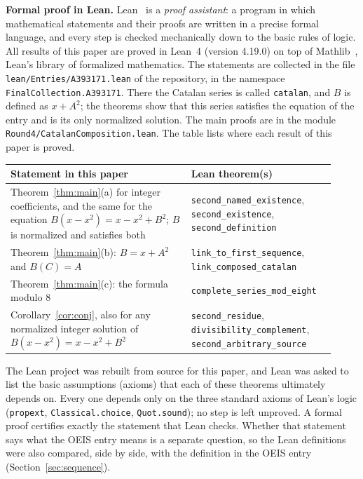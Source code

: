 \documentclass[11pt,a4paper]{article}
\theoremstyle{definition}
\theoremstyle{remark}
\newcommand{\para}[1]{\par\medskip\noindent\textbf{#1}\enspace}
\begin{document}
\para{Formal proof in Lean.}
Lean~\cite{lean} is a \emph{proof assistant}: a program in which mathematical statements and their proofs are written
in a precise formal language, and every step is checked mechanically down to the basic rules of logic. All results of
this paper are proved in Lean~4 (version 4.19.0) on top of Mathlib~\cite{mathlib}, Lean's library of formalized
mathematics. The statements are collected in the file \texttt{lean/Entries/A393171.lean} of the repository,
in the namespace \texttt{FinalCollection.A393171}. There the Catalan series is called \texttt{catalan}, and $B$ is defined as $x+A^2$; the theorems show that this series satisfies the equation of the entry and is its only normalized solution. The main proofs are in the module \texttt{Round4/CatalanComposition.lean}.
The table lists where each result of this paper is proved.
\begin{center}\small\renewcommand{\arraystretch}{1.25}
\begin{tabular}{>{\raggedright\arraybackslash}p{0.52\linewidth}>{\raggedright\arraybackslash}p{0.4\linewidth}}
\toprule
Statement in this paper & Lean theorem(s)\\
\midrule
Theorem~\ref{thm:main}(a) for integer coefficients, and the same for the equation $B(x-x^2)=x-x^2+B^2$; $B$ is normalized and satisfies both & \texttt{second\_\allowbreak{}named\_\allowbreak{}existence}, \texttt{second\_\allowbreak{}existence}, \texttt{second\_\allowbreak{}definition} \\
Theorem~\ref{thm:main}(b): $B=x+A^2$ and $B(C)=A$ & \texttt{link\_\allowbreak{}to\_\allowbreak{}first\_\allowbreak{}sequence}, \texttt{link\_\allowbreak{}composed\_\allowbreak{}catalan} \\
Theorem~\ref{thm:main}(c): the formula modulo $8$ & \texttt{complete\_\allowbreak{}series\_\allowbreak{}mod\_\allowbreak{}eight} \\
Corollary~\ref{cor:conj}, also for any normalized integer solution of $B(x-x^2)=x-x^2+B^2$ & \texttt{second\_\allowbreak{}residue}, \texttt{divisibility\_\allowbreak{}complement}, \texttt{second\_\allowbreak{}arbitrary\_\allowbreak{}source} \\
\bottomrule
\end{tabular}
\end{center}
The Lean project was rebuilt from source for this paper, and Lean was asked to list the basic assumptions (axioms)
that each of these theorems ultimately depends on. Every one depends only on the three standard axioms of Lean's logic
(\texttt{propext}, \texttt{Classical.choice}, \texttt{Quot.sound}); no step is left unproved. A formal proof certifies
exactly the statement that Lean checks. Whether that statement says what the OEIS entry means is a separate question,
so the Lean definitions were also compared, side by side, with the definition in the OEIS entry
(Section~\ref{sec:sequence}).
\end{document}
